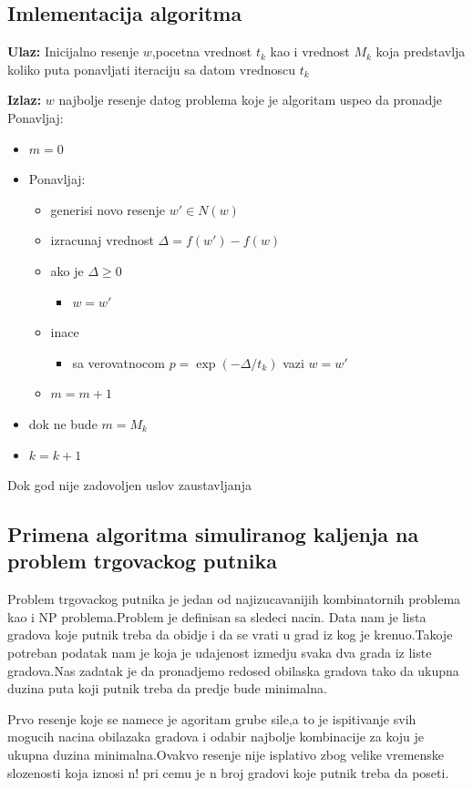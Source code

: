\documentclass[a4paper]{article}
\begin{document}
\subsection{Imlementacija algoritma}
\textbf{Ulaz:} Inicijalno resenje $w$,pocetna vrednost $t_k$ kao i vrednost $M_k$ koja predstavlja koliko puta ponavljati iteraciju sa datom vrednoscu $t_k$
 \par
\textbf{Izlaz:} $w$ najbolje resenje datog problema koje je algoritam uspeo da pronadje
\newline
Ponavljaj:
\begin{itemize}
\item[] $m=0$
\item[]  Ponavljaj:
\begin{itemize}
\item[] generisi novo resenje  $w'\in N(w)$
\item[] izracunaj vrednost  $\Delta=f(w')-f(w)$
\item[] ako je $\Delta \geq 0$
\begin{itemize}
\item[] $w=w'$ 
\end{itemize}
\item[]inace
\begin{itemize}
\item[] sa verovatnocom $p=\exp(-\Delta/t_k)$ vazi $w=w'$ 
\end{itemize}
\item[]$m=m+1$
\end{itemize}
\item[]dok ne bude $ m=M_k$
\item[] $k=k+1$
\end{itemize}
Dok god nije zadovoljen uslov zaustavljanja


\subsection{Primena algoritma simuliranog kaljenja na problem trgovackog putnika}


	Problem trgovackog putnika je jedan od najizucavanijih kombinatornih problema kao i NP problema.Problem je definisan sa sledeci nacin.
	Data nam je lista gradova koje putnik treba da obidje i da se vrati u grad iz kog je krenuo.Takoje potreban podatak nam je koja je udajenost izmedju svaka dva grada iz liste gradova.Nas zadatak je da pronadjemo redosed obilaska gradova tako da ukupna duzina puta koji putnik treba da predje bude minimalna.\par
	Prvo resenje koje se namece je agoritam grube sile,a to je ispitivanje svih mogucih nacina obilazaka gradova i odabir najbolje kombinacije za koju je ukupna duzina minimalna.Ovakvo resenje nije isplativo zbog velike vremenske slozenosti koja iznosi n! pri cemu je n broj gradovi koje putnik treba da poseti.\par
    
\end{document}

